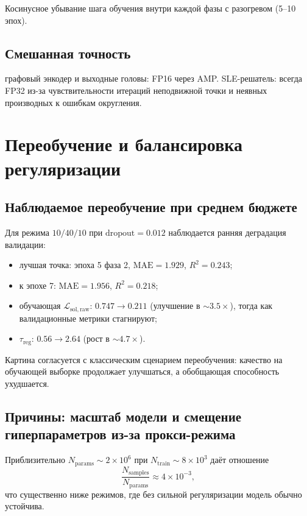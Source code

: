 \documentclass[11pt]{article}
\begin{document}
Косинусное убывание шага обучения внутри каждой фазы с разогревом (5--10 эпох).

\subsection{Смешанная точность}

графовый энкодер и выходные головы: FP16 через AMP. SLE-решатель: всегда FP32 из-за чувствительности итераций неподвижной точки и неявных производных к ошибкам округления.

\section{Переобучение и балансировка регуляризации}

\subsection{Наблюдаемое переобучение при среднем бюджете}

Для режима $10/40/10$ при $\mathrm{dropout}=0.012$ наблюдается ранняя деградация валидации:
\begin{itemize}
  \item лучшая точка: эпоха 5 фаза 2, $\mathrm{MAE}=1.929$, $R^2=0.243$;
  \item к эпохе 7: $\mathrm{MAE}=1.956$, $R^2=0.218$;
  \item обучающая $\mathcal{L}_{\mathrm{sol,raw}}$: $0.747\rightarrow0.211$ (улучшение в $\sim3.5\times$), тогда как валидационные метрики стагнируют;
  \item $\tau_{\mathrm{reg}}$: $0.56\rightarrow2.64$ (рост в $\sim4.7\times$).
\end{itemize}

Картина согласуется с классическим сценарием переобучения: качество на обучающей выборке продолжает улучшаться, а обобщающая способность ухудшается.

\subsection{Причины: масштаб модели и смещение гиперпараметров из-за прокси-режима}

Приблизительно $N_{\mathrm{params}}\sim2\times10^6$ при $N_{\mathrm{train}}\sim8\times10^3$ даёт отношение
\begin{equation*}
\frac{N_{\mathrm{samples}}}{N_{\mathrm{params}}}\approx 4\times10^{-3},
\end{equation*}
что существенно ниже режимов, где без сильной регуляризации модель обычно устойчива.
\end{document}
